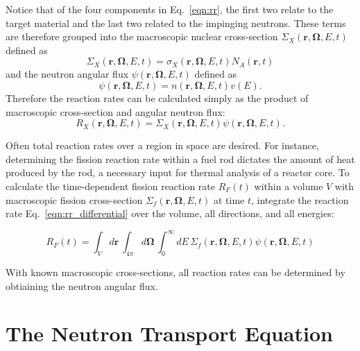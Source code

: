 Notice that of the four components in Eq.~\ref{eqn:rr}, the first two relate to the target material and the last two related to the impinging neutrons. These terms are therefore grouped into the macroscopic nuclear cross-section $\Sigma_X(\mathbf{r}, \mathbf{\Omega}, E, t)$ defined as
\begin{equation}
\Sigma_X(\mathbf{r}, \mathbf{\Omega}, E, t) = \sigma_X(\mathbf{r}, \mathbf{\Omega}, E, t) N_A(\mathbf{r}, t)
\end{equation} 
and the neutron angular flux $\psi(\mathbf{r}, \mathbf{\Omega}, E, t)$ defined as
\begin{equation}
\psi(\mathbf{r}, \mathbf{\Omega}, E, t) = n(\mathbf{r}, \mathbf{\Omega}, E, t) v(E).
\label{eqn:angular_neutron_flux}
\end{equation}
Therefore the reaction rates can be calculated simply as the product of macroscopic cross-section and angular neutron flux:
\begin{equation}
R_X(\mathbf{r}, \mathbf{\Omega}, E, t) = \Sigma_X(\mathbf{r}, \mathbf{\Omega}, E, t) \psi(\mathbf{r}, \mathbf{\Omega}, E, t).
\label{eqn:rr_differential}
\end{equation}

Often total reaction rates over a region in space are desired. For instance, determining the fission reaction rate within a fuel rod dictates the amount of heat produced by the rod, a necessary input for thermal analysis of a reactor core. To calculate the time-dependent fission reaction rate $R_F(t)$ within a volume $V$ with macroscopic fission cross-section $\Sigma_f(\mathbf{r}, \mathbf{\Omega}, E, t)$ at time $t$, integrate the reaction rate Eq.~\ref{eqn:rr_differential} over the volume, all directions, and all energies:

\begin{equation}
R_{F}(t) = \int_{V} d\mathbf{r} \,  \int_{4\pi} d\mathbf{\Omega} \, \int_{0}^{\infty} dE \, \Sigma_f(\mathbf{r}, \mathbf{\Omega}, E, t) \psi(\mathbf{r}, \mathbf{\Omega}, E, t)
\label{eqn:rr_psi}
\end{equation}

With known macroscopic cross-sections, all reaction rates can be determined by obtiaining the neutron angular flux.

\section{The Neutron Transport Equation}
\label{sec:transport-eq}

